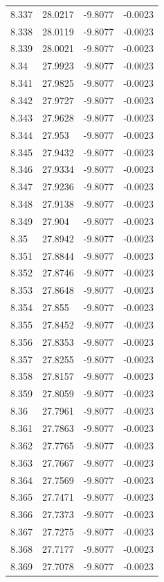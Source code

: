 \begin{tabular}{llll}
8.337 & 28.0217 & -9.8077 & -0.0023 \\
8.338 & 28.0119 & -9.8077 & -0.0023 \\
8.339 & 28.0021 & -9.8077 & -0.0023 \\
8.34 & 27.9923 & -9.8077 & -0.0023 \\
8.341 & 27.9825 & -9.8077 & -0.0023 \\
8.342 & 27.9727 & -9.8077 & -0.0023 \\
8.343 & 27.9628 & -9.8077 & -0.0023 \\
8.344 & 27.953 & -9.8077 & -0.0023 \\
8.345 & 27.9432 & -9.8077 & -0.0023 \\
8.346 & 27.9334 & -9.8077 & -0.0023 \\
8.347 & 27.9236 & -9.8077 & -0.0023 \\
8.348 & 27.9138 & -9.8077 & -0.0023 \\
8.349 & 27.904 & -9.8077 & -0.0023 \\
8.35 & 27.8942 & -9.8077 & -0.0023 \\
8.351 & 27.8844 & -9.8077 & -0.0023 \\
8.352 & 27.8746 & -9.8077 & -0.0023 \\
8.353 & 27.8648 & -9.8077 & -0.0023 \\
8.354 & 27.855 & -9.8077 & -0.0023 \\
8.355 & 27.8452 & -9.8077 & -0.0023 \\
8.356 & 27.8353 & -9.8077 & -0.0023 \\
8.357 & 27.8255 & -9.8077 & -0.0023 \\
8.358 & 27.8157 & -9.8077 & -0.0023 \\
8.359 & 27.8059 & -9.8077 & -0.0023 \\
8.36 & 27.7961 & -9.8077 & -0.0023 \\
8.361 & 27.7863 & -9.8077 & -0.0023 \\
8.362 & 27.7765 & -9.8077 & -0.0023 \\
8.363 & 27.7667 & -9.8077 & -0.0023 \\
8.364 & 27.7569 & -9.8077 & -0.0023 \\
8.365 & 27.7471 & -9.8077 & -0.0023 \\
8.366 & 27.7373 & -9.8077 & -0.0023 \\
8.367 & 27.7275 & -9.8077 & -0.0023 \\
8.368 & 27.7177 & -9.8077 & -0.0023 \\
8.369 & 27.7078 & -9.8077 & -0.0023 \\

\end{tabular}
